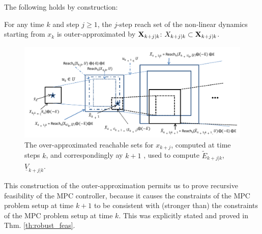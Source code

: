 The following holds by construction:
\begin{lemma}
	\label{lemma:xreach}
	For any time $k$ and step $j \geq 1$, the $j$-step reach set of the non-linear dynamics starting from $x_k$ is outer-approximated by $\mathbf{X}_{k+j|k}$:
	$X_{k+j|k} \subset \mathbf{X}_{k+j|k}$.
\end{lemma}


\begin{figure}
\includegraphics[scale=0.75]{figs/OverReachFigure_NL_scissored.pdf}
\caption{The over-approximated reachable sets for $x_{k+j}$, computed at time steps $k$, and correspondingly ay $k+1$ , used to compute $\tilde{E}_{k+j|k}$, $\underline{V}_{k+j|k}$. }
\label{fig:overreach_NL}
\end{figure}

This construction of the outer-approximation permits us to prove recursive feasibility of the MPC controller,  because it causes the constraints of the MPC problem setup at time $k+1$ to be consistent with (stronger than) the constraints of the MPC problem setup at time $k$.
This was explicitly stated and proved in Thm. \ref{th:robust_feas}.